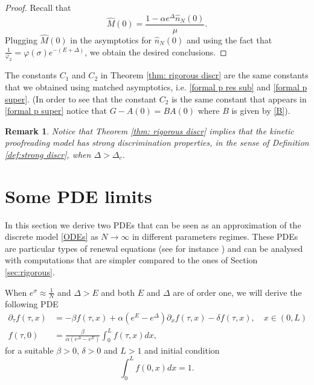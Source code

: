 \documentclass{article}
\numberwithin{equation}{section}
\theoremstyle{plain}
\newtheorem{remark}[theorem]{Remark}
\begin{document}
\begin{proof} 
Recall  that 
\begin{equation} \label{M} 
 \hat{M} (0)= \frac{1 - \alpha e^\Delta \hat{n}_{N} (0) }{\mu }.  
\end{equation}
Plugging $\hat{M}(0) $ in the asymptotics for $\hat{n}_N(0) $ and using the fact that $\frac{ 1}{\varphi_2} = \varphi(\sigma) e^{- (E+ \Delta)}$, we obtain the desired conclusions.  
\end{proof}

The constants $C_1$ and $C_2 $ in Theorem  \ref{thm: rigorous discr}  are the same constants that we obtained using matched asymptotics, i.e. \eqref{formal p res sub} and \eqref{formal p super}. (In order to see that the constant $C_2 $ is the same constant that appears in \eqref{formal p super} notice that $G-A(0)= B A(0) $ where $B$ is given by \eqref{B}). 
\begin{remark}
Notice that Theorem \ref{thm: rigorous discr} implies that the kinetic proofreading model has strong discrimination properties, in the sense of Definition \ref{def:strong discr}, when $\Delta > \Delta_c$. 
\end{remark}

\section{Some PDE limits} \label{sec:PDEs}
In this section we derive two PDEs that can be seen as an approximation of the discrete model \eqref{ODEs} as $N \to \infty$ in different parameters regimes. 
These  PDEs are particular types of renewal equations (see for instance \cite{perthame2007transport}) and can be analysed with computations that are simpler compared to the ones of Section \ref{sec:rigorous}.

When $e^\sigma \approx \frac{1}{N } $ and $\Delta > E $ and both $E$ and $\Delta $ are of order one, we will derive the following PDE
\begin{align} 
\partial_\tau f(\tau,x) &= - \beta  f(\tau,x) + \alpha \left( e^E- e^\Delta \right)  \partial_x f(\tau,x) - \delta f(\tau,x), \quad x \in (0,L) \label{PDE1} \\
f(\tau, 0) & = \frac{\beta }{\alpha ( e^\Delta - e^E ) }\int_0^L f(\tau, x) dx, \label{PDE1bound}
\end{align}
for a suitable $\beta >0$, $\delta >0$ and $L> 1$ and initial condition
\begin{equation} \label{IC PDE1}
\int_0^L f(0, x ) dx =1.  
\end{equation}
\end{document}
